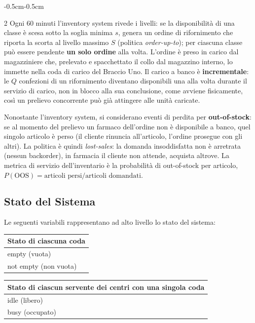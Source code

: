 \documentclass{article}
\begin{document}
\begin{adjustwidth}{-0.5cm}{-0.5cm}
\begin{multicols}{2}
Ogni 60 minuti l'inventory system rivede i livelli: se la disponibilità di una classe è scesa
sotto la soglia minima $s$, genera un ordine di rifornimento che riporta la scorta al livello
massimo $S$ (politica \emph{order-up-to}); per ciascuna classe può essere pendente \textbf{un solo
ordine} alla volta. L'ordine è preso in carico dal magazziniere che, prelevato e spacchettato il
collo dal magazzino interno, lo immette nella coda di carico del Braccio Uno. Il carico a banco è
\textbf{incrementale}: le $Q$ confezioni di un rifornimento diventano disponibili una alla volta
durante il servizio di carico, non in blocco alla sua conclusione,  come avviene fisicamente, 
così un prelievo concorrente può già attingere alle unità caricate.

Nonostante l'inventory system, si considerano eventi di perdita per \textbf{out-of-stock}: se al
momento del prelievo un farmaco dell'ordine non è disponibile a banco, quel singolo articolo è
perso (il cliente rinuncia all'articolo, l'ordine prosegue con gli altri). La politica è quindi
\emph{lost-sales}: la domanda insoddisfatta non è arretrata (nessun backorder),  in farmacia il
cliente non attende, acquista altrove. La metrica di servizio dell'inventario è la
probabilità di out-of-stock per articolo, $P(\text{OOS}) = \text{articoli persi}/\text{articoli
domandati}$.

\subsection*{Stato del Sistema}
Le seguenti variabili rappresentano ad alto livello lo stato del sistema:

\begin{minipage}{\linewidth}
\centering
\begin{tabularx}{\linewidth}{|X|}
  \hline
  \textbf{Stato di ciascuna coda} \\
  \hline
   empty (vuota)\\
  \hline
   not empty (non vuota)\\
  \hline
\end{tabularx}
\end{minipage}

\begin{minipage}{\linewidth}
\centering
\begin{tabularx}{\linewidth}{|X|}
  \hline
  \textbf{Stato di ciascun servente dei centri con una singola coda} \\
  \hline
   idle (libero)\\
  \hline
   busy (occupato)\\
  \hline
\end{tabularx}
\end{minipage}


\end{multicols}
\end{adjustwidth}
\end{document}
